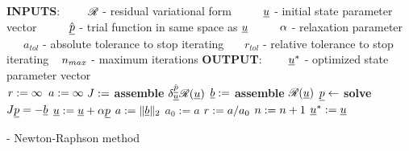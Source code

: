 \begin{algorithm}
  \normalsize
  \begin{algorithmic}[1]
    \State \textbf{INPUTS}:
    \State \ \ \ $\phantom{a_{tol}}\mathllap{\mathscr{R}}$ - residual variational form
    \State \ \ \ $\phantom{a_{tol}}\mathllap{\rankone{u}}$ - initial state parameter vector
    \State \ \ \ $\phantom{a_{tol}}\mathllap{\hat{\rankone{p}}}$ - trial function in same space as $\underline{u}$
    \State \ \ \ $\phantom{a_{tol}}\mathllap{\alpha}$ - relaxation parameter
    \State \ \ \ $a_{tol}$ - absolute tolerance to stop iterating
    \State \ \ \ $r_{tol}$ - relative tolerance to stop iterating
    \State \ \ \ $\phantom{a_{tol}}\mathllap{n_{max}}$ - maximum iterations
    \State \textbf{OUTPUT}:
    \State \ \ \ $\phantom{a_{tol}}\mathllap{\rankone{u}^*}$ - optimized state parameter vector
    \\
    \hrulefill
      \State $\phantom{\rankone{\vartheta}}\mathllap{r} := \infty$
      \State $\phantom{\rankone{\vartheta}}\mathllap{a} := \infty$
        \State $\phantom{\rankone{p}}\mathllap{J} :=$ \textbf{assemble} $\delta_{\underline{u}}^{\hat{\underline{p}}} \mathscr{R}(\underline{u})$
        \State $\phantom{\rankone{p}}\mathllap{\rankone{b}} :=$ \textbf{assemble} $\mathscr{R}(\underline{u})$
        \State $\phantom{\rankone{p}}\mathllap{\rankone{p}} \leftarrow$ \textbf{solve} $J \underline{p} = -\underline{b}$
        \State $\phantom{\rankone{p}}\mathllap{\rankone{u}} := \rankone{u} + \alpha \rankone{p}$
        \State $\phantom{\rankone{p}}\mathllap{a} := \Vert \rankone{b} \Vert_{2}$
          \State $a_0 := a$
        \EndIf
        \State $\phantom{\rankone{p}}\mathllap{r} := a / a_0$
        \State $\phantom{\rankone{p}}\mathllap{n} := n + 1$
      \EndWhile
    \State \Return $\underline{u}^* := \underline{u}$ 
    \EndFunction
  \end{algorithmic}
  \caption[Newton-Raphson]{ - Newton-Raphson method}
  \label{newton_raphson_alg}
\end{algorithm}



